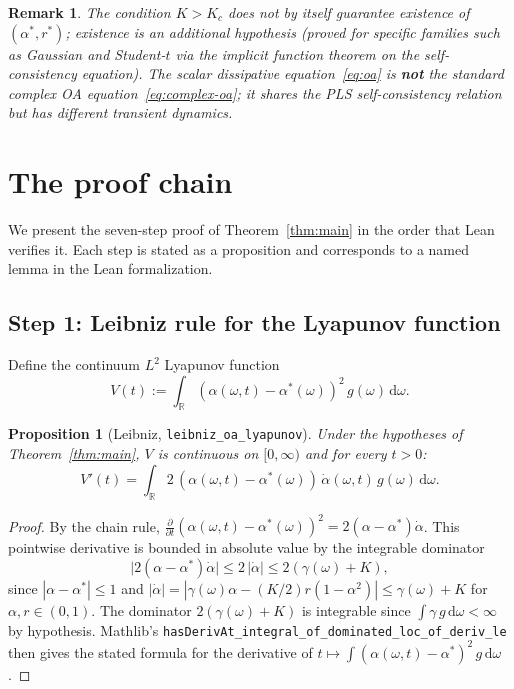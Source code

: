 \documentclass[11pt,a4paper]{article}
\newtheorem{proposition}[theorem]{Proposition}
\newtheorem{remark}[theorem]{Remark}
\theoremstyle{definition}
\newcommand{\R}{\mathbb{R}}
\begin{document}
\begin{remark}
The condition $K > K_c$ does not by itself guarantee existence of $(\alpha^*, r^*)$; existence is an additional hypothesis (proved for specific families such as Gaussian and Student-$t$ via the implicit function theorem on the self-consistency equation). The scalar dissipative equation~\eqref{eq:oa} is \textbf{not} the standard complex OA equation~\eqref{eq:complex-oa}; it shares the PLS self-consistency relation but has different transient dynamics.
\end{remark}

\section{The proof chain}\label{sec:proof}

We present the seven-step proof of Theorem~\ref{thm:main} in the order that Lean verifies it. Each step is stated as a proposition and corresponds to a named lemma in the Lean formalization.

\subsection{Step 1: Leibniz rule for the Lyapunov function}\label{sec:leibniz}

Define the continuum $L^2$ Lyapunov function
\begin{equation}\label{eq:V}
V(t) := \int_\R (\alpha(\omega,t) - \alpha^*(\omega))^2\,g(\omega)\,\mathrm{d}\omega.
\end{equation}

\begin{proposition}[Leibniz, \texttt{leibniz\_oa\_lyapunov}]\label{prop:leibniz}
Under the hypotheses of Theorem~\ref{thm:main}, $V$ is continuous on $[0,\infty)$ and for every $t > 0$:
\[
V'(t) = \int_\R 2\,(\alpha(\omega,t) - \alpha^*(\omega))\,\dot{\alpha}(\omega,t)\,g(\omega)\,\mathrm{d}\omega.
\]
\end{proposition}

\begin{proof}
By the chain rule, $\frac{\partial}{\partial t}(\alpha(\omega,t) - \alpha^*(\omega))^2 = 2(\alpha - \alpha^*)\dot{\alpha}$. This pointwise derivative is bounded in absolute value by the integrable dominator
\[
\bigl|2(\alpha - \alpha^*)\dot{\alpha}\bigr| \leq 2\,|\dot{\alpha}| \leq 2(\gamma(\omega) + K),
\]
since $|\alpha - \alpha^*| \leq 1$ and $|\dot{\alpha}| = |\gamma(\omega)\alpha - (K/2)r(1-\alpha^2)| \leq \gamma(\omega) + K$ for $\alpha, r \in (0,1)$. The dominator $2(\gamma(\omega) + K)$ is integrable since $\int \gamma\,g\,\mathrm{d}\omega < \infty$ by hypothesis. Mathlib's \texttt{hasDerivAt\_integral\_of\_dominated\_loc\_of\_deriv\_le} then gives the stated formula for the derivative of $t \mapsto \int (\alpha(\omega,t) - \alpha^*)^2\,g\,\mathrm{d}\omega$.
\end{proof}
\end{document}
